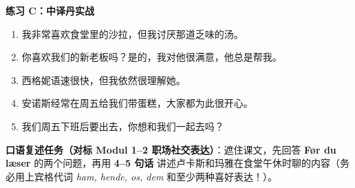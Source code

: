 \textbf{练习 C：中译丹实战}
\begin{enumerate}
  \item 我非常喜欢食堂里的沙拉，但我讨厌那道乏味的汤。
  \item 你喜欢我们的新老板吗？是的，我对他很满意，他总是帮我。
  \item 西格妮语速很快，但我依然很理解她。
  \item 安诺斯经常在周五给我们带蛋糕，大家都为此很开心。
  \item 我们周五下班后要出去，你想和我们一起去吗？
\end{enumerate}


\textbf{口语复述任务（对标 Modul 1--2 职场社交表达）}：遮住课文，先回答 \textbf{Før du læser} 的两个问题，再用 \textbf{4--5 句话} 讲述卢卡斯和玛雅在食堂午休时聊的内容（务必用上宾格代词 \textit{ham, hende, os, dem} 和至少两种喜好表达！）。

